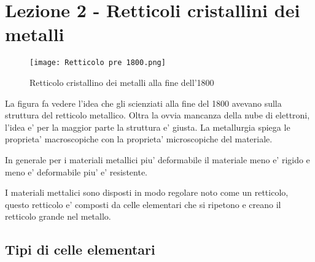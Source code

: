 \documentclass{article}
\begin{document}
    \section{Lezione 2 - Retticoli cristallini dei metalli}
        \begin{figure}[h!]
            \centering
            \texttt{[image: Retticolo pre 1800.png]}
            \caption{Retticolo cristallino dei metalli alla fine dell'1800}
        \end{figure}
        La figura fa vedere l'idea che gli scienziati alla fine del 1800 avevano sulla struttura del retticolo metallico.
        Oltra la ovvia mancanza della nube di elettroni, l'idea e' per la maggior parte la struttura e' giusta.
        \newline \newline La metallurgia spiega le proprieta' macroscopiche con la proprieta' microscopiche del materiale.

        In generale per i materiali metallici piu' deformabile il materiale meno e' rigido e meno e' deformabile piu' e' resistente.

        I materiali mettalici sono disposti in modo regolare noto come un retticolo, questo retticolo e'
         composti da celle elementari che si ripetono e creano il retticolo grande nel metallo.

        \newpage
        \subsection{Tipi di celle elementari}
\end{document}
